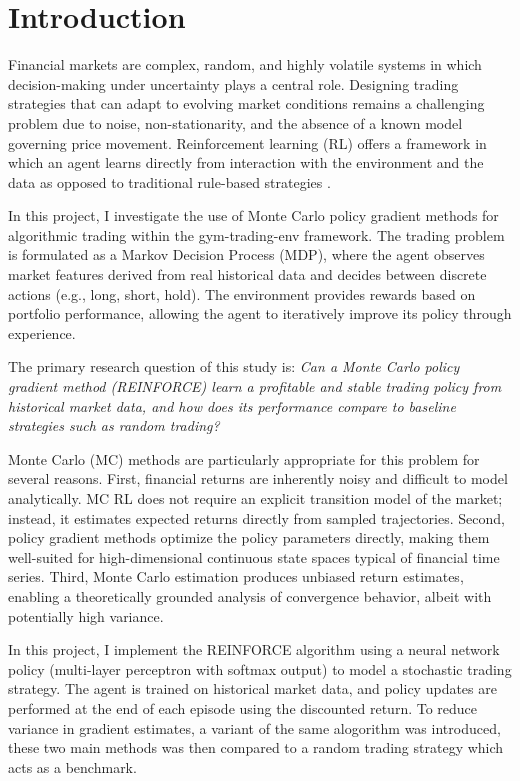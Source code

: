 \section{Introduction}

Financial markets are complex, random, and highly volatile systems in which decision-making under uncertainty plays a central role. Designing trading strategies that can adapt to evolving market conditions remains a challenging problem due to noise, non-stationarity, and the absence of a known model governing price movement. Reinforcement learning (RL) offers a framework in which an agent learns directly from interaction with the environment and the data as opposed to traditional rule-based strategies \citep{hsinhungw2024}.

In this project, I investigate the use of Monte Carlo policy gradient methods for algorithmic trading within the gym-trading-env framework. The trading problem is formulated as a Markov Decision Process (MDP), where the agent observes market features derived from real historical data and decides between discrete actions (e.g., long, short, hold). The environment provides rewards based on portfolio performance, allowing the agent to iteratively improve its policy through experience.

The primary research question of this study is: \emph{Can a Monte Carlo policy gradient method (REINFORCE) learn a profitable and stable trading policy from historical market data, and how does its performance compare to baseline strategies such as random trading?}

Monte Carlo (MC) methods are particularly appropriate for this problem for several reasons. First, financial returns are inherently noisy and difficult to model analytically. MC RL does not require an explicit transition model of the market; instead, it estimates expected returns directly from sampled trajectories. Second, policy gradient methods optimize the policy parameters directly, making them well-suited for high-dimensional continuous state spaces typical of financial time series. Third, Monte Carlo estimation produces unbiased return estimates, enabling a theoretically grounded analysis of convergence behavior, albeit with potentially high variance.

In this project, I implement the REINFORCE algorithm \citep{williams1992simple} using a neural network policy (multi-layer perceptron with softmax output) to model a stochastic trading strategy. The agent is trained on historical market data, and policy updates are performed at the end of each episode using the discounted return. To reduce variance in gradient estimates, a variant of the same alogorithm was introduced, these two main methods was then compared to a random trading strategy which acts as a benchmark.